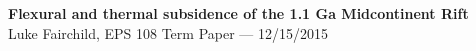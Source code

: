\documentclass[12pt,letterpaper]{article}
\begin{document}
\thispagestyle{empty}
\begin{flushleft}
{\Large \textbf{Flexural and thermal subsidence of the 1.1 Ga Midcontinent Rift}}\\
\vspace{0.3em}
Luke Fairchild, EPS 108 Term Paper --- 12/15/2015
\end{flushleft}
\end{document}

